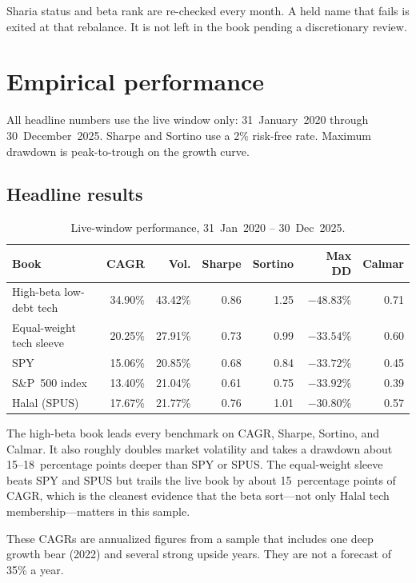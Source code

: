 \documentclass[11pt,letterpaper]{article}
\begin{document}
Sharia status and beta rank are re-checked every month. A held name that fails is exited at that rebalance. It is not left in the book pending a discretionary review.

\section{Empirical performance}
\label{sec:results}

All headline numbers use the live window only: 31~January~2020 through 30~December~2025. Sharpe and Sortino use a 2\% risk-free rate. Maximum drawdown is peak-to-trough on the growth curve.

\subsection{Headline results}

\begin{table}[htbp]
\centering
\caption{Live-window performance, 31~Jan~2020 -- 30~Dec~2025.}
\label{tab:perf}
\small
\begin{tabular}{lrrrrrr}
\toprule
Book & CAGR & Vol. & Sharpe & Sortino & Max DD & Calmar \\
\midrule
High-beta low-debt tech       & 34.90\% & 43.42\% & 0.86 & 1.25 & $-48.83\%$ & 0.71 \\
Equal-weight tech sleeve      & 20.25\% & 27.91\% & 0.73 & 0.99 & $-33.54\%$ & 0.60 \\
SPY                           & 15.06\% & 20.85\% & 0.68 & 0.84 & $-33.72\%$ & 0.45 \\
S\&P~500 index                & 13.40\% & 21.04\% & 0.61 & 0.75 & $-33.92\%$ & 0.39 \\
Halal (SPUS)                  & 17.67\% & 21.77\% & 0.76 & 1.01 & $-30.80\%$ & 0.57 \\
\bottomrule
\end{tabular}
\end{table}

The high-beta book leads every benchmark on CAGR, Sharpe, Sortino, and Calmar. It also roughly doubles market volatility and takes a drawdown about 15--18~percentage points deeper than SPY or SPUS. The equal-weight sleeve beats SPY and SPUS but trails the live book by about 15~percentage points of CAGR, which is the cleanest evidence that the beta sort---not only Halal tech membership---matters in this sample.

These CAGRs are annualized figures from a sample that includes one deep growth bear (2022) and several strong upside years. They are not a forecast of 35\% a year.
\end{document}
